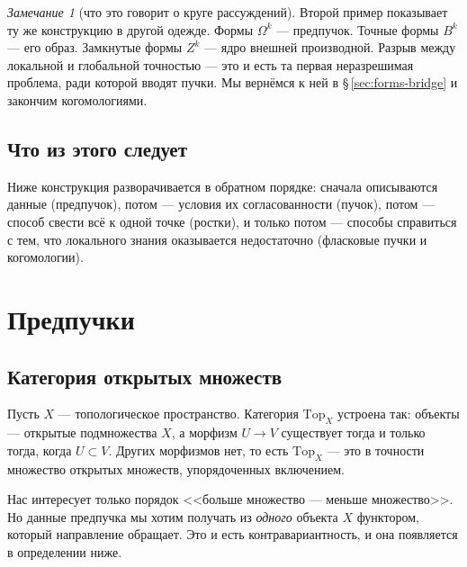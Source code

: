 \documentclass[11pt,b5paper]{article}
\newcommand{\Top}{\mathrm{Top}}
\theoremstyle{plain}
\theoremstyle{definition}
\theoremstyle{remark}
\newtheorem{reminner}[thminner]{Замечание}
\newcommand{\thmbeg}{%
  \par\smallskip
  \begin{lrbox}{\thmbox}%
  \begin{minipage}{\linewidth}}
\newcommand{\thmend}{%
  \end{minipage}%
  \end{lrbox}%
  \noindent\usebox{\thmbox}%
  \par\smallskip}
\newenvironment{rem}{\thmbeg\begin{reminner}}{\end{reminner}\thmend}
\theoremstyle{definition}
\renewcommand{\thmbeg}{\par\smallskip}
\renewcommand{\thmend}{\par\smallskip}
\let\brutsection\section
\renewcommand{\section}{\Needspace{7\baselineskip}\brutsection}
\let\brutsubsection\subsection
\renewcommand{\subsection}{\Needspace{5\baselineskip}\brutsubsection}
\begin{document}
\begin{rem}[что это говорит о круге рассуждений]
Второй пример показывает ту же конструкцию в другой одежде. Формы
$\Omega^k$ --- предпучок. Точные формы $B^k$ --- его образ. Замкнутые
формы $Z^k$ --- ядро внешней производной. Разрыв между локальной и
глобальной точностью --- это и есть та первая неразрешимая проблема,
ради которой вводят пучки. Мы вернёмся к ней в
\S\,\ref{sec:forms-bridge} и закончим когомологиями.
\end{rem}

\subsection{Что из этого следует}
Ниже конструкция разворачивается в обратном порядке: сначала
описываются данные (предпучок), потом --- условия их согласованности
(пучок), потом --- способ свести всё к одной точке (ростки), и
только потом --- способы справиться с тем, что локального знания
оказывается недостаточно (фласковые пучки и когомологии).

\section{Предпучки}

\subsection{Категория открытых множеств}
Пусть $X$ --- топологическое пространство. Категория $\Top_X$
устроена так: объекты --- открытые подмножества $X$, а морфизм
$U\to V$ существует тогда и только тогда, когда $U\subset V$. Других
морфизмов нет, то есть $\Top_X$ --- это в точности множество
открытых множеств, упорядоченных включением.

Нас интересует только порядок <<больше множество --- меньше
множество>>. Но данные предпучка мы хотим получать из \emph{одного}
объекта $X$ функтором, который направление обращает. Это и есть
контравариантность, и она появляется в определении ниже.
\end{document}
